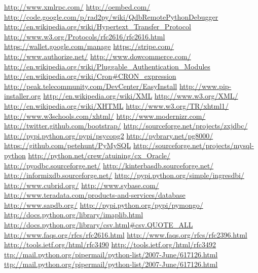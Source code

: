 \documentclass[justified,sixbynine,notoc]{tufte-book}
\begin{document}
\begin{thebibliography}{999}
 \url{http://www.xmlrpc.com/}
 \url{http://oembed.com/}
 \url{http://code.google.com/p/rad2py/wiki/QdbRemotePythonDebugger}
 \url{http://en.wikipedia.org/wiki/Hypertext_Transfer_Protocol}
 \url{http://www.w3.org/Protocols/rfc2616/rfc2616.html}
 \url{https://wallet.google.com/manage}
 \url{https://stripe.com/}
 \url{http://www.authorize.net/}
 \url{http://www.dowcommerce.com/}
 \url{http://en.wikipedia.org/wiki/Pluggable_Authentication_Modules}
 \url{http://en.wikipedia.org/wiki/Cron#CRON_expression}
 \url{http://peak.telecommunity.com/DevCenter/EasyInstall}
 \url{http://www.pip-installer.org}
 \url{http://en.wikipedia.org/wiki/XML}
 \url{http://www.w3.org/XML/}
 \url{http://en.wikipedia.org/wiki/XHTML}
 \url{http://www.w3.org/TR/xhtml1/}
 \url{http://www.w3schools.com/xhtml/}
 \url{http://www.modernizr.com/}
 \url{http://twitter.github.com/bootstrap/}
 \url{http://sourceforge.net/projects/zxjdbc/}
 \url{http://pypi.python.org/pypi/psycopg2}
 \url{http://pybrary.net/pg8000/}
 \url{https://github.com/petehunt/PyMySQL}
 \url{http://sourceforge.net/projects/mysql-python}
 \url{http://python.net/crew/atuining/cx_Oracle/}
 \url{http://pyodbc.sourceforge.net/}
 \url{http://kinterbasdb.sourceforge.net/}
 \url{http://informixdb.sourceforge.net/}
 \url{http://pypi.python.org/simple/ingresdbi/}
 \url{http://www.cubrid.org/}
 \url{http://www.sybase.com/}
 \url{http://www.teradata.com/products-and-services/database}
 \url{http://www.sapdb.org/}
 \url{http://pypi.python.org/pypi/pymongo/}
 \url{http://docs.python.org/library/imaplib.html}
 \url{http://docs.python.org/library/csv.html\#csv.QUOTE_ALL}
 \url{http://www.faqs.org/rfcs/rfc2616.html}
 \url{http://www.faqs.org/rfcs/rfc2396.html}
 \url{http://tools.ietf.org/html/rfc3490}
 \url{http://tools.ietf.org/html/rfc3492}
 \url{ttp://mail.python.org/pipermail/python-list/2007-June/617126.html}
 \url{ttp://mail.python.org/pipermail/python-list/2007-June/617126.html}

\end{thebibliography}
\end{document}
